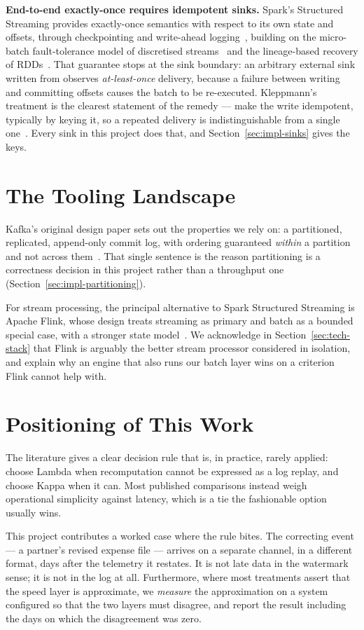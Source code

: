 \textbf{End-to-end exactly-once requires idempotent sinks.} Spark's
Structured Streaming provides exactly-once semantics with respect to its
own state and offsets, through checkpointing and write-ahead
logging~\cite{armbrust2018structured}, building on the micro-batch
fault-tolerance model of discretised
streams~\cite{zaharia2013dstreams} and the lineage-based recovery of
RDDs~\cite{zaharia2012rdd}. That guarantee stops at the sink boundary:
an arbitrary external sink written from  observes
\emph{at-least-once} delivery, because a failure between writing and
committing offsets causes the batch to be re-executed. Kleppmann's
treatment is the clearest statement of the remedy --- make the write
idempotent, typically by keying it, so a repeated delivery is
indistinguishable from a single one~\cite{kleppmann2017ddia}. Every sink
in this project does that, and Section~\ref{sec:impl-sinks} gives the
keys.

\section{The Tooling Landscape}
\label{sec:lit-tooling}

Kafka's original design paper sets out the properties we rely on: a
partitioned, replicated, append-only commit log, with ordering guaranteed
\emph{within} a partition and not across
them~\cite{kreps2011kafka,kafka_docs}. That single sentence is the reason
partitioning is a correctness decision in this project rather than a
throughput one (Section~\ref{sec:impl-partitioning}).

For stream processing, the principal alternative to Spark Structured
Streaming is Apache Flink, whose design treats streaming as primary and
batch as a bounded special case, with a stronger state
model~\cite{carbone2015flink}. We acknowledge in
Section~\ref{sec:tech-stack} that Flink is arguably the better stream
processor considered in isolation, and explain why an engine that also
runs our batch layer wins on a criterion Flink cannot help with.

\section{Positioning of This Work}
\label{sec:lit-gap}

The literature gives a clear decision rule that is, in practice, rarely
applied: choose Lambda when recomputation cannot be expressed as a log
replay, and choose Kappa when it can. Most published comparisons instead
weigh operational simplicity against latency, which is a tie the
fashionable option usually wins.

This project contributes a worked case where the rule bites. The
correcting event --- a partner's revised expense file --- arrives on a
separate channel, in a different format, days after the telemetry it
restates. It is not late data in the watermark sense; it is not in the
log at all. Furthermore, where most treatments assert that the speed
layer is approximate, we \emph{measure} the approximation on a system
configured so that the two layers must disagree, and report the result
including the days on which the disagreement was zero.
